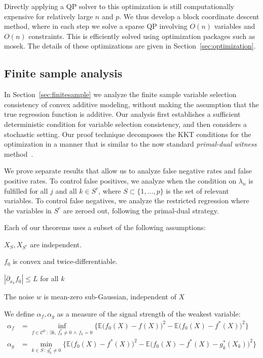 Directly applying a QP solver to this optimization is still computationally
expensive for relatively large
$n$ and $p$.  We thus develop a block
coordinate descent method, where in each step we solve a sparse
QP involving $O(n)$ variables and $O(n)$ constraints.  This 
is efficiently solved using optimization packages 
such as {\sc mosek}.  The details of these optimizations
are given in Section~\ref{sec:optimization}.


\subsection{Finite sample analysis}


In Section~\ref{sec:finitesample} 
we analyze the finite sample variable selection consistency of convex
additive modeling, without making the assumption that the true
regression function is additive.  Our analysis first establishes
a sufficient deterministic condition for variable selection 
consistency, and then considers a stochastic setting.
Our proof technique decomposes the KKT conditions for the optimization
in a manner that is similar to the now standard \emph{primal-dual
  witness} method~\cite{wainwright2009sharp}. 

We prove separate results that allow us to analyze false negative
rates and false positive rates.  To control false positives,
we analyze when the condition on $\lambda_n$ is fulfilled for all $j$
and all $k \in S^c$, where $S\subset \{1,\ldots, p\}$ is the set of
relevant variables. 
To control false negatives, we analyze the restricted regression
where the variables in $S^c$ are zeroed out, following the primal-dual
strategy.

Each of our theorems uses a subset of the following assumptions:
\begin{packed_enum}
\item[A1:] $X_S, X_{S^c}$ are independent. 
\item[A2:] $f_0$ is convex and twice-differentiable. 
\item[A3:] $|\partial_{x_k} f_0 | \leq L$ for all $k$
\item[A4:] The noise $w$ is mean-zero sub-Gaussian, independent of $X$
\end{packed_enum}

We define $\alpha_f, \alpha_g$ as a measure of the signal strength of the weakest variable:
\begin{align*}
\alpha_f &= \inf_{f \in \mathcal{C}^p \,:\, \exists k ,\, f^*_k \neq 0 \,\wedge\, f_k = 0} 
       \Big\{ \mathbb{E} \big( f_0(X) - f(X) \big)^2 - 
        \mathbb{E} \big( f_0(X) - f^*(X) \big)^2  \Big\}\\
\alpha_g &=   \min_{k \in S \,:\, g^*_k \neq 0}
      \Big\{ \mathbb{E} \big( f_0(X) - f^*(X) \big)^2 - 
    \mathbb{E} \big( f_0(X) - f^*(X) - g^*_k(X_k) \big)^2 \Big\}
\end{align*}

